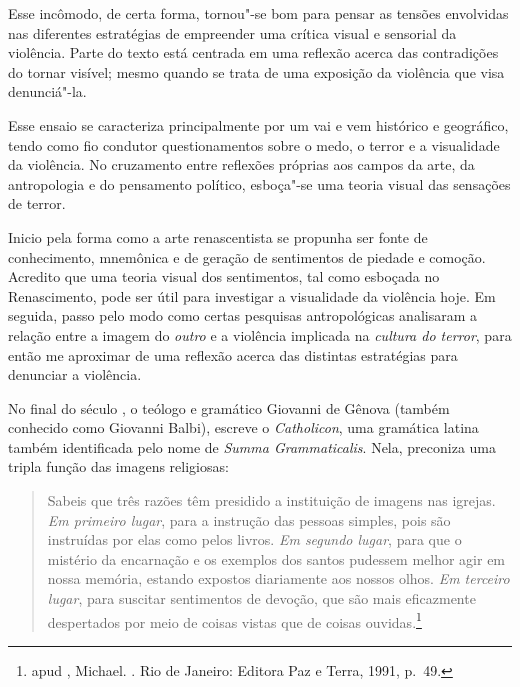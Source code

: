 Esse incômodo, de certa forma,
tornou"-se bom para pensar as tensões envolvidas nas diferentes
estratégias de empreender uma crítica visual e sensorial da violência.
Parte do texto está centrada em uma reflexão acerca das contradições do
tornar visível; mesmo quando se trata de uma exposição da violência que
visa denunciá"-la.

Esse ensaio se caracteriza principalmente por um vai e
vem histórico e geográfico, tendo como fio condutor questionamentos
sobre o medo, o terror e a visualidade da violência. No cruzamento entre
reflexões próprias aos campos da arte, da antropologia e do pensamento
político, esboça"-se uma teoria visual das sensações de terror.

Inicio pela forma como a arte renascentista se propunha
ser fonte de conhecimento, mnemônica e de geração de sentimentos de
piedade e comoção. Acredito que uma teoria visual dos sentimentos, tal
como esboçada no Renascimento, pode ser útil para investigar a
visualidade da violência hoje. Em seguida, passo pelo modo como certas
pesquisas antropológicas analisaram a relação entre a imagem do
\emph{outro} e a violência implicada na \emph{cultura do terror}, para
então me aproximar de uma reflexão acerca das distintas estratégias para
denunciar a violência.

\asterisc

No final do século , o teólogo e gramático Giovanni de Gênova
(também conhecido como Giovanni Balbi), escreve o \emph{Catholicon}, uma
gramática latina também identificada pelo nome de \emph{Summa
Grammaticalis}. Nela, preconiza uma tripla função das imagens
religiosas:

\begin{quote}
Sabeis que três razões têm presidido a instituição de imagens nas
igrejas. \emph{Em primeiro lugar}, para a instrução das pessoas simples,
pois são instruídas por elas como pelos livros. \emph{Em segundo lugar},
para que o mistério da encarnação e os exemplos dos santos pudessem
melhor agir em nossa memória, estando expostos diariamente aos nossos
olhos. \emph{Em terceiro lugar}, para suscitar sentimentos de devoção,
que são mais eficazmente despertados por meio de coisas vistas que de
coisas ouvidas.\footnote{ apud , Michael. {}. Rio de Janeiro: Editora Paz e Terra, 1991, p.~49.}
\end{quote}

